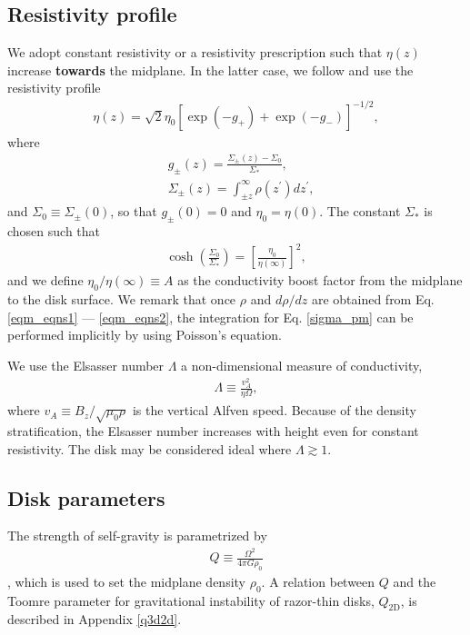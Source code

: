 \subsection{Resistivity profile}\label{resis_profile}
We adopt constant resistivity or a 
resistivity prescription such that $\eta(z)$ increase {\bf towards} the
midplane. In the latter case, we follow \cite{fleming03} and use 
the resistivity profile 
\begin{align}
  \eta(z) =
  \sqrt{2}\eta_0\left[\exp{\left(-g_+\right)}+\exp{\left(-g_-\right)}\right]^{-1/2},  
\end{align}
where
\begin{align}
  &g_\pm(z) =  \frac{\Sigma_\pm(z)-\Sigma_0}{\Sigma_*}, \\
  &\Sigma_\pm(z) = \int_{\pm z}^\infty\rho(z^\prime)dz^\prime, \label{sigma_pm}
\end{align}
and $\Sigma_0\equiv\Sigma_{\pm}(0)$, so that $g_\pm(0)=0$ and $\eta_0 
= \eta(0)$. The constant $\Sigma_*$ is chosen such that 
\begin{align}
  \cosh{\left(\frac{\Sigma_0}{\Sigma_*}\right)} =
  \left[\frac{\eta_0}{\eta(\infty)}\right]^2,
\end{align}
and we define $\eta_0/\eta(\infty)\equiv A$ as the conductivity 
boost factor from the midplane to the disk surface. We remark that
once $\rho$ and $d\rho/dz$ are obtained from
Eq. \ref{eqm_eqns1} --- \ref{eqm_eqns2}, the integration for
Eq. \ref{sigma_pm} can be performed implicitly by using Poisson's 
equation. 

We use the Elsasser number $\Lambda$ a non-dimensional measure of
conductivity,
\begin{align} 
  \Lambda \equiv \frac{v_A^2}{\eta\Omega},
\end{align}
where $v_A \equiv B_z/\sqrt{\mu_0\rho}$ is the vertical Alfven speed. 
Because of the density stratification, the Elsasser number 
increases with height even for constant resistivity. The disk may be
considered ideal where $\Lambda \gtrsim 1$. 


\subsection{Disk parameters}
The strength of self-gravity is
parametrized by 
\begin{align}
  Q \equiv \frac{\Omega^2}{4\pi G\rho_0}
\end{align}
\citep{mamat10}, which is used to set the midplane density $\rho_0$. 
A relation between $Q$ and the Toomre parameter for gravitational
instability of razor-thin disks, $Q_\mathrm{2D}$, is described in
Appendix \ref{q3d2d}.  


